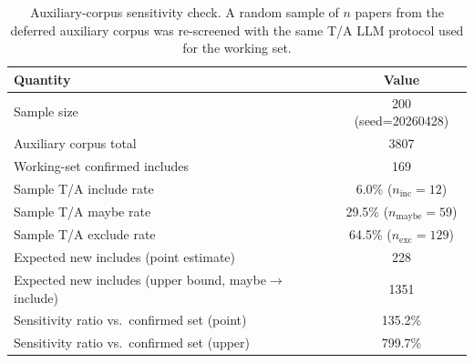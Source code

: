 \begin{table}[htbp]
\centering
\caption{Auxiliary-corpus sensitivity check. A random sample of $n$ papers from the deferred auxiliary corpus was re-screened with the same T/A LLM protocol used for the working set.}
\label{tab:sensitivity}
\begin{tabular}{lc}
\toprule
Quantity & Value \\
\midrule
Sample size & 200 (seed=20260428) \\
Auxiliary corpus total & 3807 \\
Working-set confirmed includes & 169 \\
Sample T/A include rate & 6.0\% ($n_{\text{inc}} = 12$) \\
Sample T/A maybe rate & 29.5\% ($n_{\text{maybe}} = 59$) \\
Sample T/A exclude rate & 64.5\% ($n_{\text{exc}} = 129$) \\
Expected new includes (point estimate) & 228 \\
Expected new includes (upper bound, maybe$\to$include) & 1351 \\
Sensitivity ratio vs.\ confirmed set (point) & 135.2\% \\
Sensitivity ratio vs.\ confirmed set (upper) & 799.7\% \\
\bottomrule
\end{tabular}
\end{table}